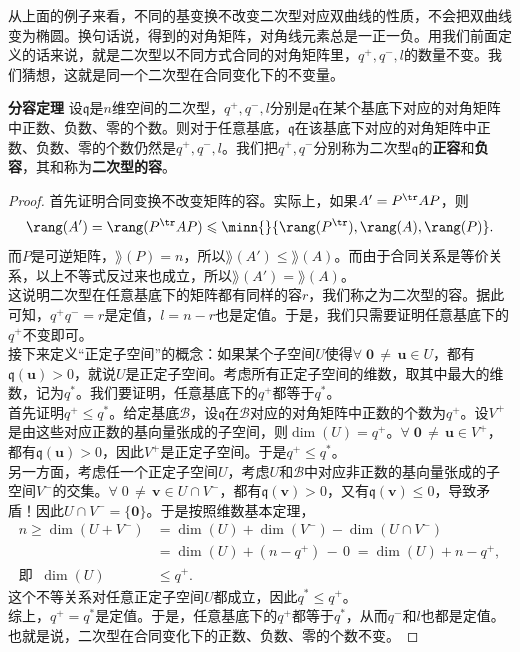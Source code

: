 \documentclass[12pt,UTF8,fontset=none]{ctexbook}
\begin{document}
从上面的例子来看，不同的基变换不改变二次型对应双曲线的性质，不会把双曲线变为椭圆。换句话说，得到的对角矩阵，对角线元素总是一正一负。用我们前面定义的话来说，就是二次型以不同方式合同的对角矩阵里，$q^+, q^-, l$的数量不变。我们猜想，这就是同一个二次型在合同变化下的不变量。

\begin{tm}{\textbf{分容定理}}
    设$\mathfrak{q}$是$n$维空间的二次型，$q^+, q^-, l$分别是$\mathfrak{q}$在某个基底下对应的对角矩阵中正数、负数、零的个数。则对于任意基底，$\mathfrak{q}$在该基底下对应的对角矩阵中正数、负数、零的个数仍然是$q^+, q^-, l$。我们把$q^+, q^-$分别称为二次型$\mathfrak{q}$的\textbf{正容}和\textbf{负容}，其和称为\textbf{二次型的容}。    
\end{tm}

\begin{proof}
    首先证明合同变换不改变矩阵的容。实际上，如果$A' = P^{\tr} A P$，则
    $$\rang(A') = \rang(P^{\tr} A P) \leqslant \minn{}\{\rang(P^{\tr}), \rang(A), \rang(P)\}.$$
    而$P$是可逆矩阵，$\rang(P) = n$，所以$\rang(A') \leqslant \rang(A)$。而由于合同关系是等价关系，以上不等式反过来也成立，所以$\rang(A') = \rang(A)$。\\
    这说明二次型在任意基底下的矩阵都有同样的容$r$，我们称之为二次型的容。据此可知，$q^ + q^- = r$是定值，$l = n - r$也是定值。于是，我们只需要证明任意基底下的$q^+$不变即可。\\
    接下来定义“正定子空间”的概念：如果某个子空间$U$使得$\forall \;\mathbf{0}\,\neq\, \mathbf{u}\in U$，都有$\mathfrak{q}(\mathbf{u}) > 0$，就说$U$是正定子空间。考虑所有正定子空间的维数，取其中最大的维数，记为$q^*$。我们要证明，任意基底下的$q^+$都等于$q^*$。\\
    首先证明$q^+ \leqslant q^*$。给定基底$\mathcal{B}$，设$\mathfrak{q}$在$\mathcal{B}$对应的对角矩阵中正数的个数为$q^+$。设$V^+$是由这些对应正数的基向量张成的子空间，则$\dim(U) = q^+$。$\forall \;\mathbf{0}\,\neq\, \mathbf{u}\in V^+$，都有$\mathfrak{q}(\mathbf{u}) > 0$，因此$V^+$是正定子空间。于是$q^+ \leqslant q^*$。\\
    另一方面，考虑任一个正定子空间$U$，考虑$U$和$\mathcal{B}$中对应非正数的基向量张成的子空间$V^-$的交集。$\forall \; 0 \,\neq \,\mathbf{v} \in U \cap V^-$，都有$\mathfrak{q}(\mathbf{v}) > 0$，又有$\mathfrak{q}(\mathbf{v}) \leqslant 0$，导致矛盾！因此$U \cap V^- = \{\mathbf{0}\}$。于是按照维数基本定理，
    \begin{align*}
        n \geqslant \dim(U + V^-) &= \dim(U) + \dim(V^-) - \dim(U \cap V^-) \\
        &= \dim(U) + (n - q^+)\, -\, 0 \; = \dim(U) + n - q^+,\\
        \mbox{即}\;\;\dim(U) &\leqslant q^+.
    \end{align*}
    这个不等关系对任意正定子空间$U$都成立，因此$q^* \leqslant q^+$。\\
    综上，$q^+ = q^*$是定值。于是，任意基底下的$q^+$都等于$q^*$，从而$q^-$和$l$也都是定值。也就是说，二次型在合同变化下的正数、负数、零的个数不变。
\end{proof}
\end{document}
